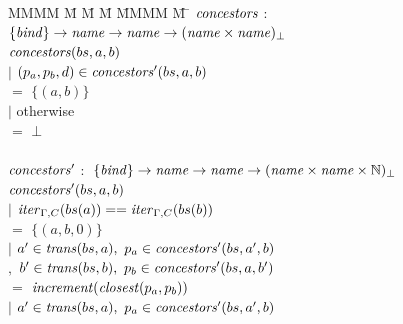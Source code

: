 \begin{figure}
%
\begin{tabbing}
MMMM \= M \= M \= M \= MMMM \= M \= \kill
$\mathit{concestors}$ \> $:$ \> $\{\mathit{bind}\} \to \mathit{name} \to \mathit{name} \to (\mathit{name} \times \mathit{name})_\bot$ \\
$\mathit{concestors}(bs, a, b)$ \\
        \> $|$ \> $(p_a,p_b,d) \in \mathit{concestors}'(bs,a,b)$ \\
        \>     \>                      \> $=$ \> $\{(a, b)\}$ \\
        \> $|$ \> otherwise \\
        \>     \>                      \> $=$    \> $\bot$ \\
\\
$\mathit{concestors}'$ \> $:$ \> $\{\mathit{bind}\} \to \mathit{name} \to \mathit{name} \to (\mathit{name} \times \mathit{name} \times \mathbb{N})_\bot$ \\
$\mathit{concestors}'(bs, a, b)$ \\
        \> $|$ \> $\mathit{iter}_{\Gamma,C}(bs(a)) == \mathit{iter}_{\Gamma,C}(bs(b))$ \\
        \>     \>                      \> $=$ \> $\{(a, b, 0)\}$ \\
        \> $|$ \> $a' \in \mathit{trans}(bs,a),~ p_a \in \mathit{concestors}'(bs,a',b)$ \\
        \> $,$ \> $b' \in \mathit{trans}(bs,b),~ p_b \in \mathit{concestors}'(bs,a,b')$ \\
        \>     \>                      \> $=$ \> $\mathit{increment}(\mathit{closest}(p_a, p_b))$ \\
        \> $|$ \> $a' \in \mathit{trans}(bs,a),~ p_a \in \mathit{concestors}'(bs,a',b)$ \\

\end{tabbing}
\end{figure}

